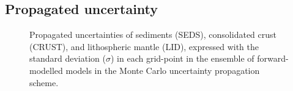 \FloatBarrier
\subsection{Propagated uncertainty}
\label{ss:SigIs:Results:Uncertainty}

\begin{figure}
    \begin{adjustbox}{center}
    \end{adjustbox}
    \caption[Propagated uncertainties: maps of standard deviation in each node for sediments, crust, and lithospheric mantle.]{Propagated uncertainties of sediments (SEDS), consolidated crust (CRUST), and lithospheric mantle (LID), expressed with the standard deviation ($\sigma$) in each grid-point in the ensemble of forward-modelled models in the Monte Carlo uncertainty propagation scheme.}
    \label{fig:SigIs:Res:UncertaintyMaps}
\end{figure}

